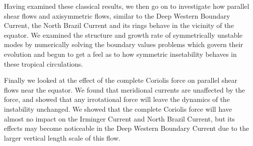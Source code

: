 Having examined these classical results, we then go on to investigate how parallel shear flows and axisymmetric flows, similar to the Deep Western Boundary Current, the North Brazil Current and its rings behave in the vicinity of the equator. We examined the structure and growth rate of symmetrically unstable modes by numerically solving the boundary values problems which govern their evolution and begun to get a feel as to how symmetric insetability behaves in these tropical circulations.

Finally we looked at the effect of the complete Coriolis force on parallel shear flows near the equator. We found that meridional currents are unaffected by the force, and showed that any irrotational force will leave the dynamics of the instability unchanged. We showed that the complete Coriolis force will have almost no impact on the Irminger Current and North Brazil Current, but its effects may become noticeable in the Deep Western Boundary Current due to the larger vertical length scale of this flow.
